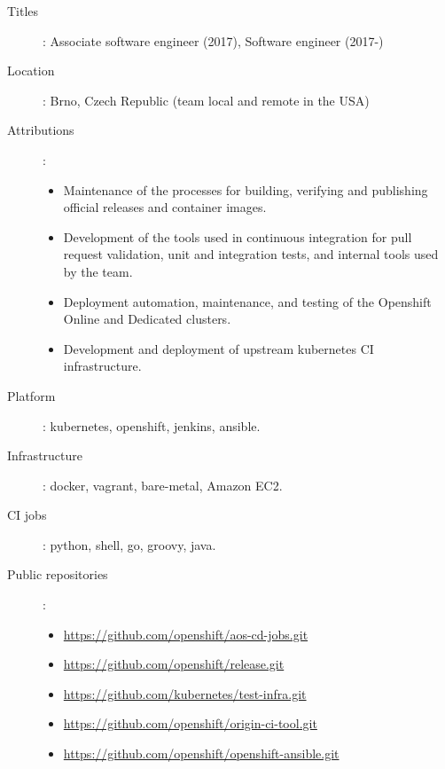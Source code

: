 \begin{description}
    \item[Titles]:
        Associate software engineer (2017), Software engineer (2017-)
    \item[Location]: Brno, Czech Republic (team local and remote in the USA)
    \item[Attributions]:
        \begin{itemize}
            \item
                Maintenance of the processes for building, verifying and
                publishing official releases and container images.
            \item
                Development of the tools used in continuous integration for
                pull request validation, unit and integration tests, and
                internal tools used by the team.
            \item
                Deployment automation, maintenance, and testing of the
                Openshift Online and Dedicated clusters.
            \item
                Development and deployment of upstream kubernetes CI
                infrastructure.
        \end{itemize}
    \item[Platform]: kubernetes, openshift, jenkins, ansible.
    \item[Infrastructure]: docker, vagrant, bare-metal, Amazon EC2.
    \item[CI jobs]: python, shell, go, groovy, java.
    \item[Public repositories]:
        \begin{itemize}
            \item \url{https://github.com/openshift/aos-cd-jobs.git}
            \item \url{https://github.com/openshift/release.git}
            \item \url{https://github.com/kubernetes/test-infra.git}
            \item \url{https://github.com/openshift/origin-ci-tool.git}
            \item \url{https://github.com/openshift/openshift-ansible.git}
        \end{itemize}
\end{description}
